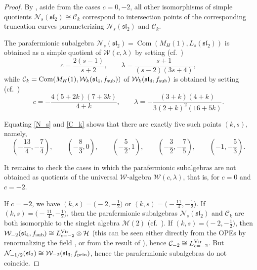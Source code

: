 \documentclass[pdftex]{sigma}
\numberwithin{equation}{section}
\begin{document}
\begin{proof}
	By \cite[Corollary 10.1]{Linshaw}, aside from the cases
$c=0,-2$,
all other isomorphisms of simple quotients $\mathcal N_s(\mathfrak{sl}_2) \cong \mathcal C_k $ correspond to intersection points
 of the corresponding truncation curves parameterizing $\mathcal N_s(\mathfrak{sl}_2)$ and $\mathcal C_k $.

The parafermionic subalgebra $\mathcal N_s(\mathfrak{sl}_2) = \operatorname{Com} (M_H(1) , L_s(\mathfrak{sl}_2)) $ is obtained as a simple quotient of $\mathcal W (c, \lambda)$ by setting (cf.\ \cite[Theorem 7.1]{Linshaw})
\begin{equation} \label{N_s}
	c = \frac{2(s - 1)}{s + 2}, \qquad \lambda = \frac{s + 1}{(s -2)(3s + 4)},
\end{equation}
while $ \mathcal C_k = \operatorname{Com} (M_H(1), \mathcal W_k(\mathfrak{sl}_4, f_{\rm sub})) $ of $\mathcal W_k(\mathfrak{sl}_4, f_{\rm sub})$ is obtained by setting (cf.\ \cite[Theorem~7.3]{Linshaw})
\begin{equation} \label{C_k}
	c = -\frac{4(5 + 2k)(7 + 3k)}{4 + k}, \qquad \lambda = - \frac{(3 + k)(4 + k)}{3(2 + k)^{2}(16 + 5k)}.
\end{equation}

 Equating \eqref{N_s} and \eqref{C_k} shows that there are exactly five such points $(k, s)$, namely,
 \[
 \left( -\frac{13}{4}, -\frac{7}{4}\right),\qquad \left( -\frac{8}{3}, 0\right),\qquad \left( -\frac{5}{2}, 1\right),\qquad \left( -\frac{3}{2}, -\frac{7}{5}\right),\qquad \left( -1, -\frac{5}{3}\right).
 \]

 It remains to check the cases in which the parafermionic subalgebras are not obtained as quotients of the universal $\mathcal W$-algebra $\mathcal W (c, \lambda)$, that is, for $c=0$ and $c=-2$.

 If $c=-2$, we have $(k,s) = \bigl(-2, -\frac{1}{2}\bigr)$ or $(k,s) = \bigl(-\frac{11}{4}, -\frac{1}{2}\bigr)$.
 If $(k,s) = \bigl(-\frac{11}{4}, -\frac{1}{2}\bigr)$, then the parafermionic subalgebras $\mathcal N_s(\mathfrak{sl}_2)$ and $\mathcal C_k $ are both isomorphic to the singlet algebra $\mathcal M(2)$ (cf.~\cite{Ridout,Wang}). If $(k,s) = \bigl(-2, -\frac{1}{2}\bigr)$, then $\mathcal W_{-2}(\mathfrak{sl}_4, f_{\rm sub})\cong L^{\rm Vir}_{c=-2} \otimes \mathcal H$ (this can be seen either directly from the OPEs by renormalizing the field , or from the result of \cite[Section 5.4]{CFLN}), hence $\mathcal C_{-2} \cong L^{\rm Vir}_{c=-2} $. But $\mathcal N_{-1/2}(\mathfrak{sl}_2) \cong \mathcal W_{-2}(\mathfrak{sl}_3, f_{\rm prin})$, hence the parafermionic subalgebras do not coincide.


\end{proof}
\end{document}
